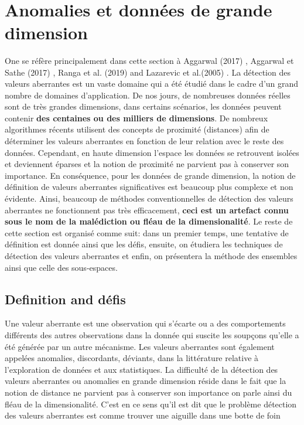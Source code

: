 \newpage
\  
\newpage
\section{Anomalies et données de grande dimension}
%
One se réfère principalement dans cette section  à Aggarwal (2017) \cite{A1}, Aggarwal et Sathe (2017) \cite{A8}, Ranga et al. (2019) \cite{A10} and Lazarevic et al.(2005) \cite{A14} .\newl 
La détection des valeurs aberrantes est un vaste domaine qui a été étudié dans le cadre d’un grand nombre de domaines d’application. De nos jours, de nombreuses données réelles sont de très grandes dimensions, dans certains scénarios, les données peuvent contenir \textbf{des centaines ou des milliers de dimensions}. De nombreux algorithmes récents utilisent des concepts de proximité (distances) afin de déterminer les valeurs aberrantes en fonction de leur relation avec le reste des données.  Cependant,  en haute dimension l’espace les données se retrouvent  isolées et deviennent éparses et la notion de proximité ne parvient pas à conserver son importance. En conséquence, pour les données de grande dimension, la notion de définition de valeurs aberrantes significatives est beaucoup plus complexe et non évidente.  Ainsi, beaucoup de  méthodes conventionnelles de  détection des valeurs aberrantes ne fonctionnent pas très efficacement, \textbf{ceci est un artefact connu sous le nom de  la malédiction ou fléau de la dimensionalité}. \newl
Le reste de cette section est organisé comme suit: dans un premier temps, une tentative de définition est donnée ainsi que les défis, ensuite, on étudiera les techniques de détection des valeurs aberrantes et enfin, on présentera la méthode des ensembles ainsi que celle des sous-espaces. 
%
%
\subsection{Definition and défis}
%
%
Une valeur aberrante est une observation qui s'écarte ou a des comportements différents des autres observations dans la donnée qui suscite les soupçons qu'elle a été générée par un autre
mécanisme. Les valeurs aberrantes sont également appelées anomalies, discordants, déviants,
dans la littérature relative à l'exploration de données et aux statistiques. \cite{A1}\newl
La difficulté de la détection des valeurs aberrantes ou anomalies en grande dimension réside dans le fait que la notion de distance ne parvient pas à conserver son importance on parle ainsi du fléau de la dimensionalité. C'est en ce sens qu'il est dit que le problème détection des valeurs aberrantes est comme trouver une aiguille dans une botte de foin \cite{A14}
%
